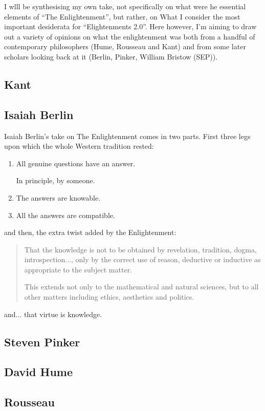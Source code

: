 \documentclass[10pt,titlepage]{book}
\begin{document}
I wlll be synthesising my own take, not specifically on what were he essential elements of ``The Enlightenment'', but rather, on What I consider the  most important desiderata for ``Elightenments 2.0''.
Here however, I'm aiming to draw out a variety of opinions on what the enlightenment was both from a handful of contemporary philosophers (Hume, Rousseau and Kant) and from some later scholars looking back at it (Berlin, Pinker, William Bristow (SEP)).

\subsection{Kant}

\subsection{Isaiah Berlin}

Isaiah Berlin's take on The Enlightenment comes in two parts.
First three legs upon which the whole Western tradition rested:
\begin{enumerate}
  \item All genuine questions have an answer.

    In principle, by someone.
\item  The answers are knowable.
\item All the answers are compatible.
\end{enumerate}

and then, the extra twist added by the Enlightenment:
\begin{quotation}
That the knowledge is not to be obtained by revelation, tradition, dogma, introspection..., only by the correct use of reason, deductive or inductive as appropriate to the subject matter.

This extends not only to the mathematical and natural sciences, but to all other matters including ethics, aesthetics and politics.
\end{quotation}
and... that virtue is knowledge.


\subsection{Steven Pinker}

\subsection{David Hume}

\subsection{Rousseau}
\end{document}
